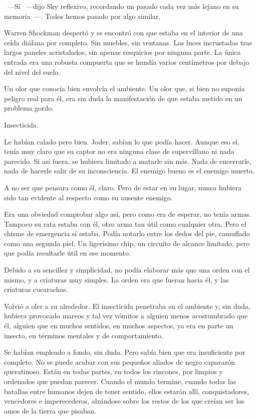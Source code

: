 ~---Sí ~---dijo Sky reflexivo, recordando un pasado cada vez más lejano en su memoria~---. Todos hemos pasado por algo similar.

\parbreak
Warren Shockman despertó y se encontró con que estaba en el interior de una celda diáfana por completo. Sin muebles, sin ventanas. Las luces incrustadas tras largos paneles acristalados, sin apenas resquicios por ninguna parte. La única entrada era una robusta compuerta que se hundía varios centímetros por debajo del nivel del suelo.

Un olor que conocía bien envolvía el ambiente. Un olor que, si bien no suponía peligro real para él, era sin duda la manifestación de que estaba metido en un problema gordo.

Insecticida.

Le habían calado pero bien. Joder, sabían lo que podía hacer. Aunque eso sí, tenía muy claro que su captor no era ninguna clase de supervillano ni nada parecido. Si así fuera, se hubiera limitado a matarle sin más. Nada de encerrarle, nada de hacerle salir de su inconsciencia. El enemigo bueno es el enemigo muerto.

A no ser que pensara como él, claro. Pero de estar en su lugar, nunca hubiera sido tan evidente al respecto como su ausente enemigo.

Era una obviedad comprobar algo así, pero como era de esperar, no tenía armas. Tampoco su rata estaba con él, otro arma tan útil como cualquier otra. Pero el chisme de emergencia sí estaba. Podía notarlo entre los dedos del pie, camuflado como una segunda piel. Un ligerísimo chip, un circuito de alcance limitado, pero que podía resultarle útil en ese momento.

Debido a su sencillez y simplicidad, no podía elaborar más que una orden con el mismo, y a criaturas muy simples. La orden era que fueran hacia él, y las criaturas cucarachas.

Volvió a oler a su alrededor. El insecticida penetraba en el ambiente y, sin duda, hubiera provocado mareos y tal vez vómitos a alguien menos acostumbrado que él, alguien que en muchos sentidos, en muchos aspectos, ya era en parte un insecto, en términos mentales y de comportamiento.

Se habían empleado a fondo, sin duda. Pero sabía bien que era insuficiente por completo. No se puede acabar con sus pequeños aliados de negro caparazón queratinoso. Están en todas partes, en todos los rincones, por limpios y ordenados que puedan parecer. Cuando el mundo termine, cuando todas las batallas entre humanos dejen de tener sentido, ellos estarán allí, conquistadores, vencedores e imperecederos, alzándose sobre los restos de los que creían ser los amos de la tierra que pisaban.

